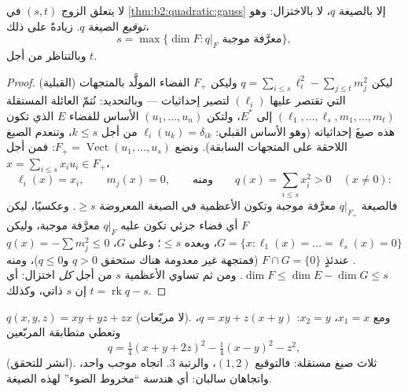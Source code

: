 \begin{theorem}\label{thm:b2:quadratic:sylvester}
لا يتعلق الزوج $(s, t)$ في \cref{thm:b2:quadratic:gauss} إلا
بالصيغة $q$، لا بالاختزال: وهو
\emph{توقيع} الصيغة $q$.
زيادةً على ذلك،
\[
s = \max\{\dim F : q|_F \text{ معرَّفة موجبة}\},
\]
وبالتناظر من أجل $t$.
\end{theorem}

\begin{proof}
ليكن $q = \sum_{i \leq s}\ell_i^2 - \sum_{j\leq t} m_j^2$ وليكن
$F_+$ الفضاء المولَّد بالمتجهات (القبلية) التي تقتصر عليها $(\ell_i)$
لتصير إحداثيات --- وبالتحديد: نُتمّ العائلة
المستقلة $(\ell_1, \dots, \ell_s, m_1, \dots, m_t)$
إلى  $E^*$، ولتكن $(u_1, \dots, u_n)$
الأساس للفضاء $E$ الذي تكون هذه صيغَ إحداثياته (وهو الأساس
القبلي: $\ell_i(u_k) = \delta_{ik}$ من أجل $k \leq s$،
وتنعدم الصيغ اللاحقة على المتجهات السابقة). ونضع $F_+ =
\operatorname{Vect}(u_1, \dots, u_s)$: فمن أجل $x = \sum_{i\leq
s}x_iu_i \in F_+$،
\[
\ell_i(x) = x_i,
\qquad m_j(x) = 0,
\qquad\text{ومنه}\qquad
q(x) = \sum_{i\leq s}x_i^2 > 0 \quad (x \neq 0) :
\]
فالصيغة $q|_{F_+}$ معرَّفة موجبة وتكون الأعظمية في الصيغة المعروضة
$\geq s$. وعكسيًا، ليكن $F$ أي فضاء جزئي تكون عليه $q|_F$
معرَّفة موجبة، وليكن $G = \{x : \ell_1(x) = \dots = \ell_s(x) =
0\}$، وبعده  $\leq s$؛ وعلى $G$، $q(x) = -\sum m_j^2 \leq 0$.
عندئذٍ $F \cap G = \{0\}$ (فمتجهة غير معدومة هناك ستحقق $q > 0$
و$q \leq 0$)، ومنه $\dim F \leq \dim E - \dim G \leq s$. ومن ثم تساوي
الأعظمية $s$ من أجل \emph{كل} اختزال: أي إن $s$ ذاتي، وكذلك $t
= \operatorname{rk} q - s$.
\end{proof}

\begin{example}\label{ex:b2:quadratic:gaussexample}
$q(x, y, z) = xy + yz + zx$ (لا مربّعات). ومع $x_1 = x$، $x_2 =
y$: $q = xy + z(x + y)$، وتعطي متطابقة المربّعين
\[
q = \tfrac14(x + y + 2z)^2 - \tfrac14(x - y)^2 - z^2 ,
\]
(انشر للتحقق). ثلاث صيغ مستقلة: فالتوقيع $(1, 2)$،
والرتبة $3$. اتجاه موجب واحد، واتجاهان سالبان: أي هندسة
``مخروط الضوء'' لهذه الصيغة.
\end{example}

